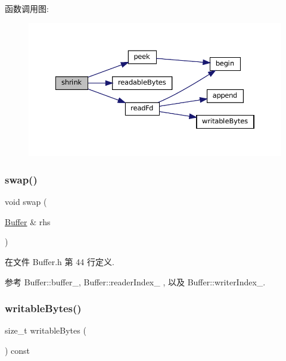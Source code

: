 函数调用图\+:
\nopagebreak
\begin{figure}[H]
\begin{center}
\leavevmode
\includegraphics[width=350pt]{classmuduo_1_1Buffer_a69095875ff26fe7eff163afde6eb7c9e_cgraph}
\end{center}
\end{figure}
\mbox{\label{classmuduo_1_1Buffer_a5a6560acf9880bf7a3b210c07bb3db2e}} 
\subsubsection{\texorpdfstring{swap()}{swap()}}
{\footnotesize\ttfamily void swap (\begin{DoxyParamCaption}\item[{\hyperlink{classmuduo_1_1Buffer}{Buffer} \&}]{rhs }\end{DoxyParamCaption})\hspace{0.3cm}{\ttfamily [inline]}}



在文件 Buffer.\+h 第 44 行定义.



参考 Buffer\+::buffer\+\_\+, Buffer\+::reader\+Index\+\_\+ , 以及 Buffer\+::writer\+Index\+\_\+.

\mbox{\label{classmuduo_1_1Buffer_a998888da42aba8e7ff1977405f7c33e3}} 
\subsubsection{\texorpdfstring{writable\+Bytes()}{writableBytes()}}
{\footnotesize\ttfamily size\+\_\+t writable\+Bytes (\begin{DoxyParamCaption}{ }\end{DoxyParamCaption}) const\hspace{0.3cm}{\ttfamily [inline]}}



